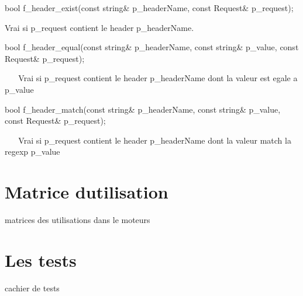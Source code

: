 \begin{DoxyItemize}
\item 
\begin{DoxyCode}
\textcolor{keywordtype}{bool} f\_header\_exist(\textcolor{keyword}{const} \textcolor{keywordtype}{string}& p\_headerName, \textcolor{keyword}{const} Request& p\_request); 
\end{DoxyCode}
 Vrai si p\+\_\+request contient le header p\+\_\+header\+Name. ~\newline
~\newline
 ~\newline
~\newline

\item 
\begin{DoxyCode}
\textcolor{keywordtype}{bool} f\_header\_equal(\textcolor{keyword}{const} \textcolor{keywordtype}{string}& p\_headerName, \textcolor{keyword}{const} \textcolor{keywordtype}{string}& p\_value, \textcolor{keyword}{const} Request& p\_request); 
\end{DoxyCode}
 ~\newline
~\newline
 Vrai si p\+\_\+request contient le header p\+\_\+header\+Name dont la valeur est egale a p\+\_\+value ~\newline
~\newline

\item 
\begin{DoxyCode}
\textcolor{keywordtype}{bool} f\_header\_match(\textcolor{keyword}{const} \textcolor{keywordtype}{string}& p\_headerName, \textcolor{keyword}{const} \textcolor{keywordtype}{string}& p\_value, \textcolor{keyword}{const} Request& p\_request); 
\end{DoxyCode}
 ~\newline
~\newline
 Vrai si p\+\_\+request contient le header p\+\_\+header\+Name dont la valeur match la regexp p\+\_\+value ~\newline
~\newline

\end{DoxyItemize}



 \hypertarget{index_sec_usages}{}\section{Matrice d\textquotesingle{}utilisation}\label{index_sec_usages}





\begin{DoxyItemize}
\item matrices des utilisations dans le moteurs  
\end{DoxyItemize}



 \hypertarget{index_sec_tests}{}\section{Les tests}\label{index_sec_tests}





\begin{DoxyItemize}
\item cachier de tests  
\end{DoxyItemize}